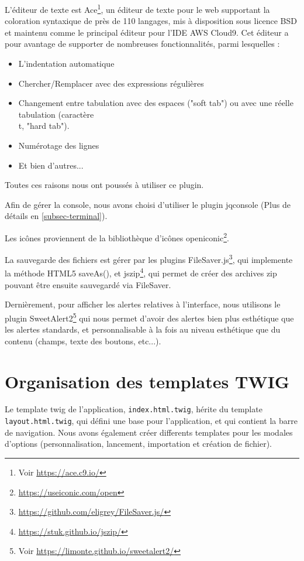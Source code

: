 L'éditeur de texte est Ace\footnote{Voir \url{https://ace.c9.io/}}, un éditeur de texte pour le web supportant la coloration syntaxique de près de 110 langages, mis à disposition sous licence BSD et maintenu comme le principal éditeur pour l'IDE AWS Cloud9. Cet éditeur a pour avantage de supporter de nombreuses fonctionnalités, parmi lesquelles :

\begin{itemize}
  \item L'indentation automatique
  \item Chercher/Remplacer avec des expressions régulières
  \item Changement entre tabulation avec des espaces ("soft tab") ou avec une réelle tabulation (caractère \\t, "hard tab").
  \item Numérotage des lignes
  \item Et bien d'autres...
\end{itemize}

Toutes ces raisons nous ont poussés à utiliser ce plugin.

Afin de gérer la console, nous avons choisi d'utiliser le plugin jqconsole (Plus de détails en \ref{subsec-terminal}).

Les icônes proviennent de la bibliothèque d'icônes openiconic\footnote{\url{https://useiconic.com/open}}.

La sauvegarde des fichiers est gérer par les plugins FileSaver.js\footnote{\url{https://github.com/eligrey/FileSaver.js/}}, qui implemente la méthode HTML5 saveAs(), et jszip\footnote{\url{https://stuk.github.io/jszip/}}, qui permet de créer des archives zip pouvant être ensuite sauvegardé via FileSaver.

Dernièrement, pour afficher les alertes relatives à l'interface, nous utilisons le plugin SweetAlert2\footnote{Voir \url{https://limonte.github.io/sweetalert2/}} qui nous permet d'avoir des alertes bien plus esthétique que les alertes standards, et personnalisable à la fois au niveau esthétique que du contenu (champs, texte des boutons, etc...).

\section{Organisation des templates TWIG}

Le template twig de l'application, \texttt{index.html.twig}, hérite du template \texttt{layout.html.twig}, qui défini une base pour l'application, et qui contient la barre de navigation. Nous avons également créer differents templates pour les modales d'options (personnalisation, lancement, importation et création de fichier).

